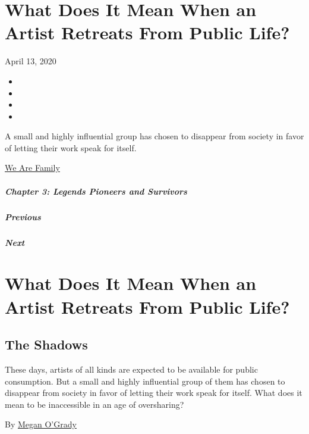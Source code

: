 \hypertarget{what-does-it-mean-when-an-artist-retreats-from-public-life}{%
\section{What Does It Mean When an Artist Retreats From Public
Life?}\label{what-does-it-mean-when-an-artist-retreats-from-public-life}}

April 13, 2020

\begin{itemize}
\item
\item
\item
\item
\end{itemize}

A small and highly influential group has chosen to disappear from
society in favor of letting their work speak for itself.

\href{https://www.nytimes3xbfgragh.onion/interactive/2020/04/13/t-magazine/culture-issue-2020.html}{We
Are Family}

\hypertarget{chapter-3-legends-pioneers-and-survivors}{%
\subparagraph{Chapter 3: Legends Pioneers and
Survivors}\label{chapter-3-legends-pioneers-and-survivors}}

\hypertarget{previous}{%
\subparagraph{Previous}\label{previous}}

\hypertarget{next}{%
\subparagraph{Next}\label{next}}

\hypertarget{what-does-it-mean-when-an-artist-retreats-from-public-life-1}{%
\section{What Does It Mean When an Artist Retreats From Public
Life?}\label{what-does-it-mean-when-an-artist-retreats-from-public-life-1}}

\hypertarget{the-shadows}{%
\subsection{The Shadows}\label{the-shadows}}

These days, artists of all kinds are expected to be available for public
consumption. But a small and highly influential group of them has chosen
to disappear from society in favor of letting their work speak for
itself. What does it mean to be inaccessible in an age of oversharing?

By \href{https://www.nytimes3xbfgragh.onion/by/megan-o-grady}{Megan
O'Grady}

